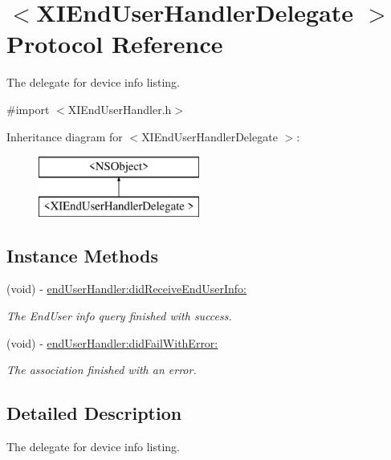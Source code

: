 \hypertarget{protocol_x_i_end_user_handler_delegate_01-p}{}\section{$<$X\+I\+End\+User\+Handler\+Delegate $>$ Protocol Reference}
\label{protocol_x_i_end_user_handler_delegate_01-p}


The delegate for device info listing.  




{\ttfamily \#import $<$X\+I\+End\+User\+Handler.\+h$>$}

Inheritance diagram for $<$X\+I\+End\+User\+Handler\+Delegate $>$\+:\begin{figure}[H]
\begin{center}
\leavevmode
\includegraphics[height=2.000000cm]{protocol_x_i_end_user_handler_delegate_01-p}
\end{center}
\end{figure}
\subsection*{Instance Methods}
\begin{DoxyCompactItemize}
\item 
(void) -\/ \hyperlink{protocol_x_i_end_user_handler_delegate_01-p_a0c55fb34803563aa252942903d6216b6}{end\+User\+Handler\+:did\+Receive\+End\+User\+Info\+:}
\begin{DoxyCompactList}\small\item\em The End\+User info query finished with success. \end{DoxyCompactList}\item 
(void) -\/ \hyperlink{protocol_x_i_end_user_handler_delegate_01-p_aeb6d8cfc627717ab2d408c5f7fb84450}{end\+User\+Handler\+:did\+Fail\+With\+Error\+:}
\begin{DoxyCompactList}\small\item\em The association finished with an error. \end{DoxyCompactList}\end{DoxyCompactItemize}


\subsection{Detailed Description}
The delegate for device info listing. 

